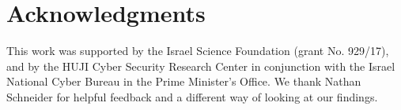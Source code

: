 \documentclass[11pt, a4paper]{article}
\newcommand{\lc}[1]{\footnote{\color{blue}LC: #1}}
\begin{document}
%
%
%

\section*{Acknowledgments}

This work was supported by the Israel Science Foundation (grant No. 929/17),
and by the HUJI Cyber Security Research Center in conjunction with the Israel
National Cyber Bureau in the Prime Minister's Office.
We thank Nathan Schneider for helpful feedback and a different way of looking at our findings.



\end{document}
